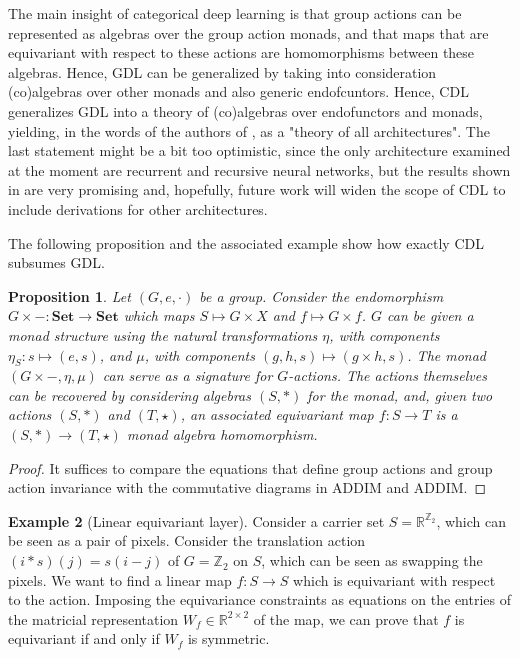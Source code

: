 \documentclass[11pt,a4paper,openright,twoside]{report}
\theoremstyle{plain}
\newtheorem{proposition}{Proposition}
\theoremstyle{definition}
\newtheorem{example}[proposition]{Example}
\begin{document}
The main insight of categorical deep learning is that group actions can be represented as algebras over the group action monads, and that maps that are equivariant with respect to these actions are homomorphisms between these algebras. Hence, GDL can be generalized by taking into consideration (co)algebras over other monads and also generic endofcuntors. Hence, CDL generalizes GDL into a theory of (co)algebras over endofunctors and monads, yielding, in the words of the authors of \cite{gavranovicposition}, as a "theory of all architectures". The last statement might be a bit too optimistic, since the only architecture examined at the moment are recurrent and recursive neural networks, but the results shown in \cite{gavranovicposition} are very promising and, hopefully, future work will widen the scope of CDL to include derivations for other architectures.

The following proposition and the associated example show how exactly CDL subsumes GDL.

\begin{proposition}
  Let $(G,e,\cdot)$ be a group. Consider the endomorphism $G \times -: \mathbf{Set} \to \mathbf{Set}$ which maps $S \mapsto G \times X$ and $f \mapsto G \times f$. $G$ can be given a monad structure using the natural transformations $\eta$, with components $\eta_S: s \mapsto (e,s)$, and $\mu$, with components $(g,h,s) \mapsto (g \times h, s)$. 
  The monad $(G \times -, \eta, \mu)$ can serve as a signature for $G$-actions. The actions themselves can be recovered by considering algebras $(S,\ast)$ for the monad, and, given two actions $(S,\ast)$ and $(T,\star)$, an associated equivariant map $f: S \to T$ is a $(S,\ast) \to (T,\star)$ monad algebra homomorphism.
\end{proposition}
\begin{proof}
  It suffices to compare the equations that define group actions and group action invariance with the commutative diagrams in ADDIM and ADDIM.
\end{proof}

\begin{example}[Linear equivariant layer]
  \label{ex: translationaction}
  Consider a carrier set $S = \mathbb{R}^{\mathbb{Z}_2}$, which can be seen as a pair of pixels. Consider the translation action $(i \ast s)(j) = s(i-j)$ of $G = \mathbb{Z}_2$ on $S$, which can be seen as swapping the pixels.
  We want to find a linear map $f: S \to S$ which is equivariant with respect to the action. Imposing the equivariance constraints as equations on the entries of the matricial representation $W_f \in \mathbb{R}^{2 \times 2}$ of the map, we can prove that $f$ is equivariant if and only if $W_f$ is symmetric.
\end{example}
\end{document}
